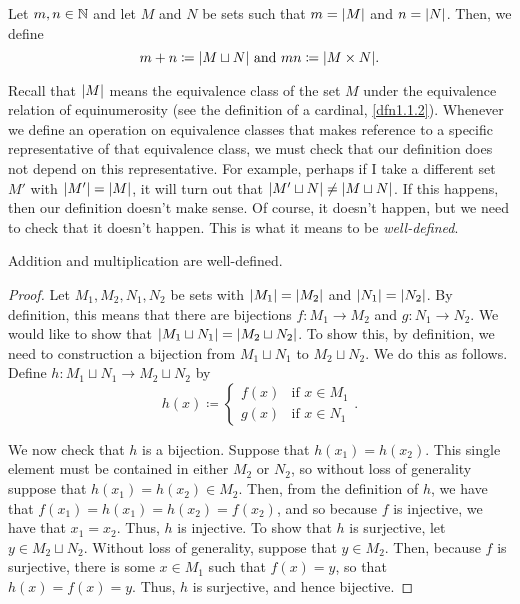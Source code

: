 \begin{dfn}
Let $m,n\in \mathbb{N}$ and let $M$ and $N$ be sets such that $m=\lvert M\rvert$ and $n=\lvert N\rvert$.  Then, we define
\begin{equation}
m+n\coloneqq \lvert M\sqcup N\rvert\text{ and }mn\coloneqq \lvert M\times N\rvert.
\end{equation}
\begin{rmk}
Recall that $\lvert M\rvert$ means the equivalence class of the set $M$ under the equivalence relation of equinumerosity (see the definition of a cardinal, \cref{dfn1.1.2}).  Whenever we define an operation on equivalence classes that makes reference to a specific representative of that equivalence class, we must check that our definition does not depend on this representative.  For example, perhaps if I take a different set $M'$ with $\lvert M'\rvert=\lvert M\rvert$, it will turn out that $\lvert M'\sqcup N\rvert\neq \lvert M\sqcup N\rvert$.  If this happens, then our definition doesn't make sense.  Of course, it doesn't happen, but we need to check that it doesn't happen.  This is what it means to be \emph{well-defined}.
\end{rmk}
\begin{prp}
Addition and multiplication are well-defined.
\begin{proof}
Let $M_1,M_2,N_1,N_2$ be sets with $\lvert M_1\rvert=\lvert M_2\rvert$ and $\lvert N_1\rvert=\lvert N_2\rvert$.  By definition, this means that there are bijections $f:M_1\rightarrow M_2$ and $g:N_1\rightarrow N_2$.  We would like to show that $\lvert M_1\sqcup N_1\rvert=\lvert M_2\sqcup N_2\rvert$.  To show this, by definition, we need to construction a bijection from $M_1\sqcup N_1$ to $M_2\sqcup N_2$.  We do this as follows.  Define $h:M_1\sqcup N_1\rightarrow M_2\sqcup N_2$ by
\begin{equation}
h(x)\coloneqq \begin{cases}f(x) & \text{if }x\in M_1 \\ g(x) & \text{if }x\in N_1\end{cases}.
\end{equation}

We now check that $h$ is a bijection.  Suppose that $h(x_1)=h(x_2)$.  This single element must be contained in either $M_2$ or $N_2$, so without loss of generality suppose that $h(x_1)=h(x_2)\in M_2$.  Then, from the definition of $h$, we have that $f(x_1)=h(x_1)=h(x_2)=f(x_2)$, and so because $f$ is injective, we have that $x_1=x_2$.  Thus, $h$ is injective.  To show that $h$ is surjective, let $y\in M_2\sqcup N_2$.  Without loss of generality, suppose that $y\in M_2$.  Then, because $f$ is surjective, there is some $x\in M_1$ such that $f(x)=y$, so that $h(x)=f(x)=y$.  Thus, $h$ is surjective, and hence bijective.


\end{proof}
\end{prp}
\end{dfn}
